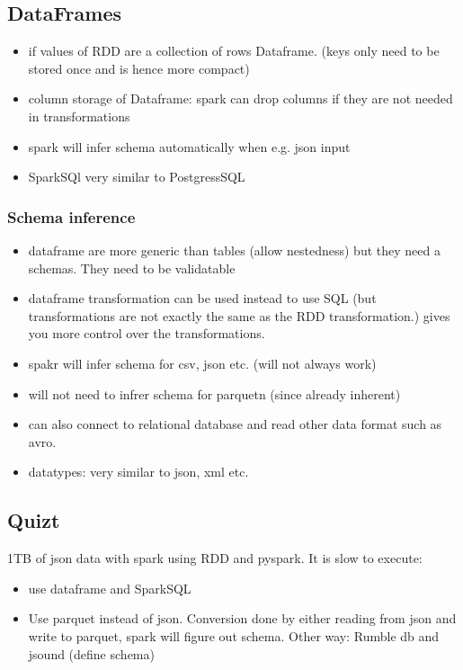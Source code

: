 \subsection{DataFrames}
\begin{itemize}
    \item if values of RDD are a collection of rows \textrightarrow Dataframe. (keys only need to be stored once and is hence more compact)
    \item column storage of Dataframe: spark can drop columns if they are not needed in transformations
    \item spark will infer schema automatically when e.g. json input
    \item SparkSQl very similar to PostgressSQL
\end{itemize}

\subsubsection{Schema inference}
\begin{itemize}
    \item dataframe are more generic than tables (allow nestedness) but they need a schemas. They need to be validatable
    \item dataframe transformation can be used instead to use SQL (but transformations are not exactly the same as the RDD transformation.)
    gives you more control over the transformations.
    \item spakr will infer schema for csv, json etc. (will not always work)
    \item will not need to infrer schema for parquetn (since already inherent)
    \item can also connect to relational database and read other data format such as avro.
    \item datatypes: very similar to json, xml etc.
\end{itemize}

\subsection{Quizt}
1TB of json data with spark using RDD and pyspark. It is slow to execute:
\begin{itemize}
    \item use dataframe and SparkSQL
    \item Use parquet instead of json. Conversion done by either reading from json and write to parquet, spark will
    figure out schema. Other way: Rumble db and jsound (define schema)
\end{itemize}


